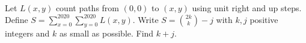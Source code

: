 Let $L(x,y)$ count paths from $(0,0)$ to $(x,y)$ using unit right and up steps. Define $S=\sum_{x=0}^{2020}\sum_{y=0}^{2020}L(x,y)$. Write $S=\binom{2k}{k}-j$ with $k,j$ positive integers and $k$ as small as possible. Find $k+j$.
